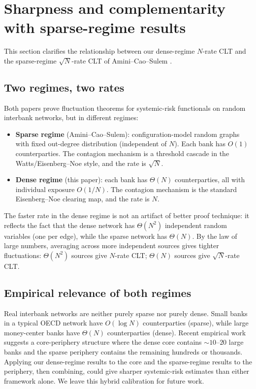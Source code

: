 \documentclass[11pt,a4paper]{article}
\theoremstyle{definition}
\begin{document}
\section{Sharpness and complementarity with sparse-regime results}
\label{sec:sharpness}

This section clarifies the relationship between our dense-regime $N$-rate CLT
and the sparse-regime $\sqrt N$-rate CLT of Amini--Cao--Sulem
\cite{AminiCaoSulem2021,AminiCaoSulem2024SIAM}.

\subsection{Two regimes, two rates}

Both papers prove fluctuation theorems for systemic-risk functionals on
random interbank networks, but in different regimes:

\begin{itemize}[leftmargin=1.5em]
\item \textbf{Sparse regime} (Amini--Cao--Sulem): configuration-model random
  graphs with fixed out-degree distribution (independent of $N$). Each bank
  has $O(1)$ counterparties. The contagion mechanism is a threshold cascade
  in the Watts/Eisenberg--Noe style, and the rate is $\sqrt N$.
\item \textbf{Dense regime} (this paper): each bank has $\Theta(N)$
  counterparties, all with individual exposure $O(1/N)$. The contagion
  mechanism is the standard Eisenberg--Noe clearing map, and the rate is $N$.
\end{itemize}

The faster rate in the dense regime is not an artifact of better proof
technique: it reflects the fact that the dense network has $\Theta(N^2)$
independent random variables (one per edge), while the sparse network has
$\Theta(N)$. By the law of large numbers, averaging across more independent
sources gives tighter fluctuations: $\Theta(N^2)$ sources give $N$-rate CLT;
$\Theta(N)$ sources give $\sqrt N$-rate CLT.

\subsection{Empirical relevance of both regimes}

Real interbank networks are neither purely sparse nor purely dense. Small
banks in a typical OECD network have $O(\log N)$ counterparties (sparse),
while large money-center banks have $\Theta(N)$ counterparties (dense).
Recent empirical work \cite{Hurd2023} suggests a core-periphery structure
where the dense core contains $\sim 10$--$20$ large banks and the sparse
periphery contains the remaining hundreds or thousands. Applying our
dense-regime results to the core and the sparse-regime results to the
periphery, then combining, could give sharper systemic-risk estimates than
either framework alone. We leave this hybrid calibration for future work.
\end{document}
